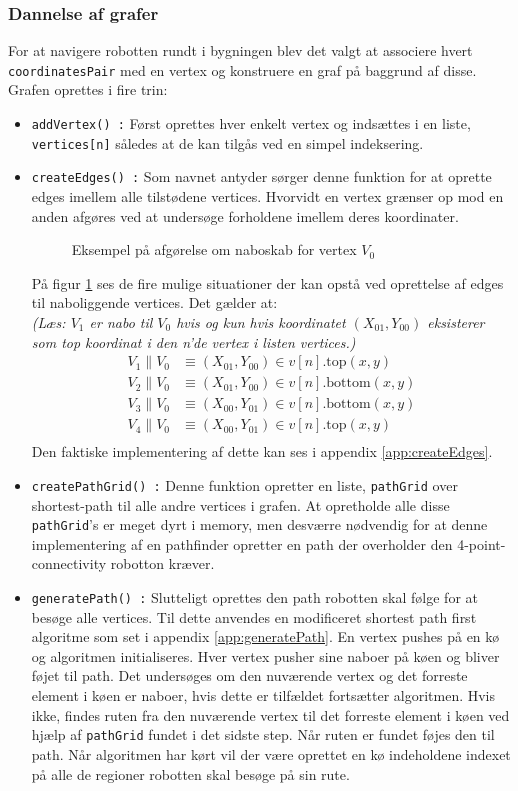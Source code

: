 \subsubsection{Dannelse af grafer}
For at navigere robotten rundt i bygningen blev det valgt at associere hvert \texttt{coordinatesPair} med en vertex og konstruere en graf på baggrund af disse. Grafen oprettes i fire trin:
\begin{itemize}
	\item \texttt{addVertex() :} Først oprettes hver enkelt vertex og indsættes i en liste, \texttt{vertices[n]} således at de kan tilgås ved en simpel indeksering.
	\item \texttt{createEdges() :} Som navnet antyder sørger denne funktion for at oprette edges imellem alle tilstødene vertices. Hvorvidt en vertex grænser op mod en anden afgøres ved at undersøge forholdene imellem deres koordinater. 
\begin{figure}[h!]
	\label{fig:coordRelation}
	\caption{Eksempel på afgørelse om naboskab for vertex $V_0$}
\end{figure}
På figur \ref{fig:coordRelation} ses de fire mulige situationer der kan opstå ved oprettelse af edges til naboliggende vertices. Det gælder at: \\
\scriptsize\emph{(Læs: $V_1$ er nabo til $V_0$ hvis og kun hvis koordinatet $(X_{01},Y_{00})$ eksisterer som top koordinat i den n'de vertex i listen vertices.)}
\normalsize	 	 
	 \begin{align*}
	 V_1\parallel V_0 & \equiv(X_{01},Y_{00})\in v[n].\text{top}(x,y)	 \\
	 V_2\parallel V_0 & \equiv(X_{01},Y_{00})\in v[n].\text{bottom}(x,y)\\
	 V_3\parallel V_0 & \equiv(X_{00},Y_{01})\in v[n].\text{bottom}(x,y)\\
	 V_4\parallel V_0 & \equiv(X_{00},Y_{01})\in v[n].\text{top}(x,y)\\
	 \end{align*}
Den faktiske implementering af dette kan ses i appendix \ref{app:createEdges}.
	 \item \texttt{createPathGrid() :} Denne funktion opretter en liste, \texttt{pathGrid} over shortest-path til alle andre vertices i grafen. At opretholde alle disse \texttt{pathGrid}'s er meget dyrt i memory, men desværre nødvendig for at denne implementering af en pathfinder opretter en path der overholder den 4-point-connectivity robotton kræver.
	 \item \texttt{generatePath() :} Slutteligt oprettes den path robotten skal følge for at besøge alle vertices. Til dette anvendes en modificeret shortest path first algoritme som set i appendix \ref{app:generatePath}. En vertex pushes på en kø og algoritmen initialiseres. Hver vertex pusher sine naboer på køen og bliver føjet til path. Det undersøges om den nuværende vertex og det forreste element i køen er naboer, hvis dette er tilfældet fortsætter algoritmen. Hvis ikke, findes ruten fra den nuværende vertex til det forreste element i køen ved hjælp af \texttt{pathGrid} fundet i det sidste step. Når ruten er fundet føjes den til path. Når algoritmen har kørt vil der være oprettet en kø indeholdene indexet på alle de regioner robotten skal besøge på sin rute.

\end{itemize}
